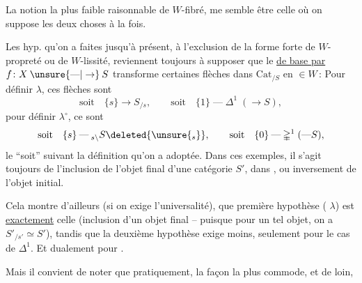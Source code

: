 
 La notion la plus faible raisonnable de $W$-fibré, me semble être celle où on suppose les deux choses à la fois.

Les hyp. qu'on a faites jusqu'à présent, à l'exclusion de la forme forte  de $W$-propreté ou de $W$-lissité, reviennent toujours à supposer que le \uline{ de base par} $f\colon X\mathbin{\unsure{\text{---}|\to}}S$ transforme certaines flèches dans $\mathrm{Cat}_{/S}$ en $\in W$\,: Pour définir $\lambda$, ces flèches sont
\[
\text{soit}\quad\{s\}\to S_{/s},\qquad\text{soit}\quad\{1\}\mathbin{\text{---}}\mathbb{\Delta}^{1}\;(\to S),
\]
pour définir $\lambda^\circ$, ce sont
\[
\text{soit}\quad\{s\}\mathbin{\text{---}}{}_{s\backslash}S\deleted{\unsure{_{s}}},\qquad\text{soit}\quad\{0\}\mathbin{\text{---}}\mathbb{\Delta}^1\;(\mathbin{\text{---}}S),
\]
le ``soit'' suivant la définition qu'on a adoptée. Dans ces exemples, il s'agit toujours de l'inclusion de l'objet final d'une catégorie $S'$, dans , ou inversement de l'objet initial.

Cela montre d'ailleurs (si on exige l'universalité), que  première hypothèse ( $\lambda$) est \uline{exactement} celle (inclusion d'un objet final  -- puisque pour un tel objet, on a $S'_{/s'}\simeq S'$), tandis que la deuxième hypothèse exige moins, seulement pour le cas de $\mathbb{\Delta}^1$. Et dualement pour \deleted{\unsure{$\lambda$}} .

Mais il convient de noter que pratiquement, la façon la plus commode, et de loin,

